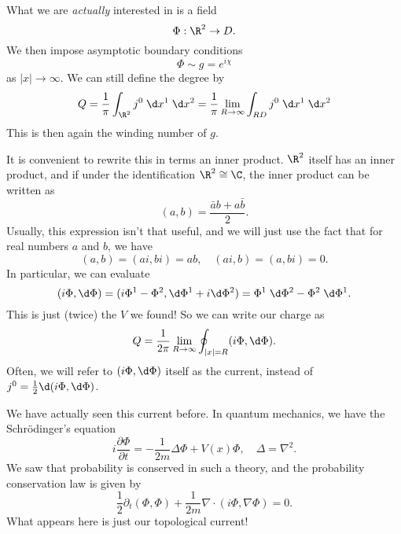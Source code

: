 \documentclass[a4paper]{article}
\begin{document}
What we are \emph{actually} interested in is a field
\[
  \Phi: \R^2 \to D.
\]
We then impose asymptotic boundary conditions
\[
  \Phi \sim g = e^{i\chi}
\]
as $|x| \to \infty$. We can still define the degree by
\[
  Q = \frac{1}{\pi} \int_{\R^2} j^0 \;\d x^1 \;\d x^2 = \frac{1}{\pi} \lim_{R \to \infty}\int_{RD} j^0 \;\d x^1 \;\d x^2
\]
This is then again the winding number of $g$.

It is convenient to rewrite this in terms an inner product. $\R^2$ itself has an inner product, and if under the identification $\R^2 \cong \C$, the inner product can be written as
\[
  (a, b) = \frac{\bar{a} b + a \bar{b}}{2}.
\]
Usually, this expression isn't that useful, and we will just use the fact that for real numbers $a$ and $b$, we have
\[
  (a, b) = (ai, bi) = ab, \quad (ai, b) = (a, bi) = 0.
\]
In particular, we can evaluate
\[
  (i \Phi, \d \Phi) = (i \Phi^1 - \Phi^2, \d \Phi^1 + i \d \Phi^2) = \Phi^1\;\d \Phi^2 - \Phi^2\;\d \Phi^1.
\]
This is just (twice) the $V$ we found! So we can write our charge as
\[
  Q = \frac{1}{2\pi} \lim_{R \to \infty} \oint_{|x| = R} (i \Phi, \d \Phi).
\]
Often, we will refer to $(i \Phi, \d \Phi)$ itself as the current, instead of $j^0 = \frac{1}{2} \d (i \Phi, \d \Phi)$.


We have actually seen this current before. In quantum mechanics, we have the Schr\"odinger's equation
\[
  i \frac{\partial \Phi}{\partial t} = - \frac{1}{2m} \Delta \Phi + V(x) \Phi,\quad \Delta = \nabla^2.
\]
We saw that probability is conserved in such a theory, and the probability conservation law is given by
\[
  \frac{1}{2} \partial_t (\Phi, \Phi) + \frac{1}{2m} \nabla \cdot (i \Phi, \nabla \Phi) = 0.
\]
What appears here is just our topological current!
\end{document}
